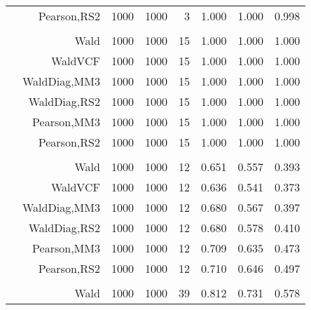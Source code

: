 \documentclass[
]{article}
\begin{document}
\begin{table}[H]
{\begin{tabular}[t]{lrrrrrrr}
\hspace{1em} & Pearson,RS2 & 1000 & 1000 & 3 & 1.000 & 1.000 & 0.998\\
\cmidrule{1-8}
\addlinespace[0.3em]
\multicolumn{8}{l}{\textbf{1F 15V}}\\
\hspace{1em} & Wald & 1000 & 1000 & 15 & 1.000 & 1.000 & 1.000\\

\hspace{1em} & WaldVCF & 1000 & 1000 & 15 & 1.000 & 1.000 & 1.000\\

\hspace{1em} & WaldDiag,MM3 & 1000 & 1000 & 15 & 1.000 & 1.000 & 1.000\\

\hspace{1em} & WaldDiag,RS2 & 1000 & 1000 & 15 & 1.000 & 1.000 & 1.000\\

\hspace{1em} & Pearson,MM3 & 1000 & 1000 & 15 & 1.000 & 1.000 & 1.000\\

\hspace{1em} & Pearson,RS2 & 1000 & 1000 & 15 & 1.000 & 1.000 & 1.000\\
\cmidrule{1-8}
\addlinespace[0.3em]
\multicolumn{8}{l}{\textbf{2F 10V}}\\
\hspace{1em} & Wald & 1000 & 1000 & 12 & 0.651 & 0.557 & 0.393\\

\hspace{1em} & WaldVCF & 1000 & 1000 & 12 & 0.636 & 0.541 & 0.373\\

\hspace{1em} & WaldDiag,MM3 & 1000 & 1000 & 12 & 0.680 & 0.567 & 0.397\\

\hspace{1em} & WaldDiag,RS2 & 1000 & 1000 & 12 & 0.680 & 0.578 & 0.410\\

\hspace{1em} & Pearson,MM3 & 1000 & 1000 & 12 & 0.709 & 0.635 & 0.473\\

\hspace{1em} & Pearson,RS2 & 1000 & 1000 & 12 & 0.710 & 0.646 & 0.497\\
\cmidrule{1-8}
\addlinespace[0.3em]
\multicolumn{8}{l}{\textbf{3F 15V}}\\
\hspace{1em} & Wald & 1000 & 1000 & 39 & 0.812 & 0.731 & 0.578\\


\end{tabular}}
\end{table}
\end{document}
